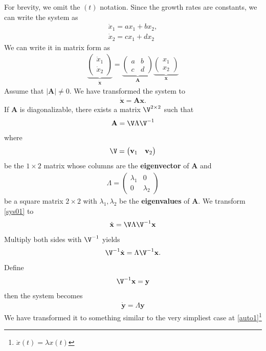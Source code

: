 \documentclass[11pt,a4paper]{book}
\theoremstyle{definition}\newtheorem{definition}{Definition}
\theoremstyle{definition}\newtheorem{fact}{Fact}
\theoremstyle{definition}\newtheorem{remark}{Remark}
\theoremstyle{definition}\newtheorem{ex}{Ex.}
\theoremstyle{definition}\newtheorem{project}{Project}
\theoremstyle{definition}\newtheorem{problem}{Problem}
\theoremstyle{definition}\newtheorem{example}{Example}
\numberwithin{theorem}{section}
\numberwithin{corollary}{chapter}
\numberwithin{assumption}{chapter}
\numberwithin{definition}{chapter}
\numberwithin{prop}{chapter}
\numberwithin{notation}{chapter}
\numberwithin{problem}{chapter}
\numberwithin{example}{chapter}
\numberwithin{fact}{chapter}
\numberwithin{ex}{chapter}
\def\A{\mathbf A}
\def\v{\mathbf v}
\def\x{\mathbf x}
\def\y{\mathbf y}
\begin{document}
	For brevity, we omit the $(t)$ notation. Since the growth rates are constants, we can write the system as
	\begin{align*}
		\dot{x}_1 = a x_1 + b x_2, \\
		\dot{x}_2 = c x_1 + d x_2
	\end{align*}
	We can write it in matrix form as
	\begin{align*}
		\underbrace{\begin{pmatrix}
			\dot{x}_1 \\ \dot{x}_2
		\end{pmatrix}}_{\dot{\x}}
		= 
		\underbrace{\begin{pmatrix}
			a & b \\ c & d
		\end{pmatrix}}_{\A}
		\underbrace{\begin{pmatrix}
			x_1 \\ x_2
		\end{pmatrix}}_{\x}
	\end{align*}
	Assume that $|\A| \neq 0$. We have transformed the system to
	\begin{align}
		\dot{\x} = \A \x. \label{sys01}
	\end{align}
	If $\A$ is diagonalizable, there exists a matrix $\V^{2\times 2}$ such that
	\begin{align*}
		\A = \V \Lambda \V^{-1}
	\end{align*}
	where 
	\begin{align*}
		\V = \begin{pmatrix}
			\v_1 & \v_2
		\end{pmatrix}
	\end{align*}
	be the $1\times 2$ matrix whose columns are the \textbf{eigenvector} of $\A$ and
	\begin{align*}
		\Lambda = \begin{pmatrix}
			\lambda_1 & 0 \\
			0 & \lambda_2
		\end{pmatrix}
	\end{align*}
	be a square matrix $2\times 2$ with $\lambda_1, \lambda_2$ be the \textbf{eigenvalues} of $\A$. We transform \eqref{sys01} to
	\begin{align*}
		\dot{\x} = \V \Lambda \V^{-1} \x 
	\end{align*} 
	Multiply both sides with $\V^{-1}$ yields
	\begin{align*}
		\V^{-1} \dot{\x} = \Lambda \V^{-1} \x.
	\end{align*}
	Define
	\begin{align*}
		\V^{-1} \x = \y 
	\end{align*}
	then the system becomes
	\begin{align}
		\dot{\y} = \Lambda \y  \label{keysys}
	\end{align}
	We have transformed it to something similar to the very simpliest case at \eqref{auto1}\footnote{$\dot{x}(t) = \lambda x(t)$}
	
\end{document}
